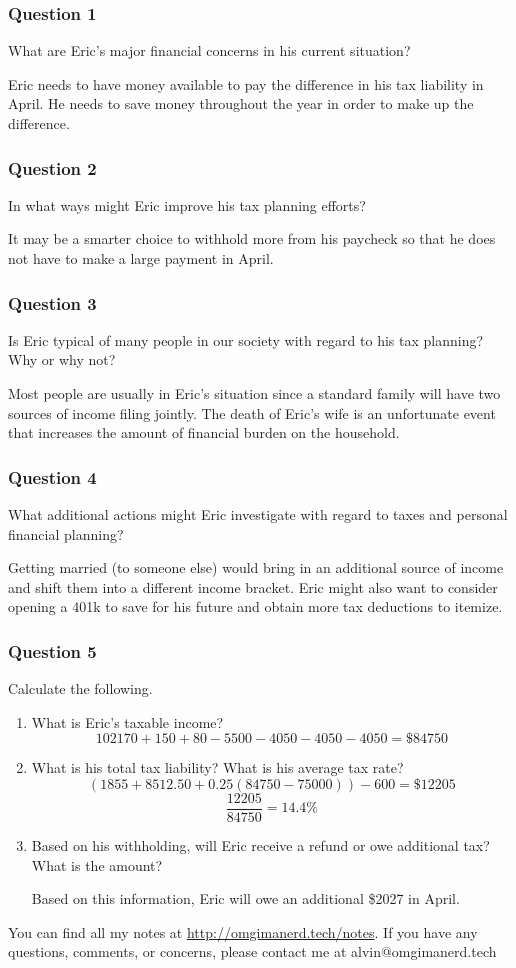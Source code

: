 \documentclass{math}
\begin{document}
\subsubsection*{Question 1}
What are Eric's major financial concerns in his current situation? \par
Eric needs to have money available to pay the difference in his tax liability
in April. He needs to save money throughout the year in order to make up the
difference.

\subsubsection*{Question 2}
In what ways might Eric improve his tax planning efforts? \par
It may be a smarter choice to withhold more from his paycheck so that he does
not have to make a large payment in April.

\subsubsection*{Question 3}
Is Eric typical of many people in our society with regard to his tax planning?
Why or why not? \par
Most people are usually in Eric's situation since a standard family will have
two sources of income filing jointly. The death of Eric's wife is an unfortunate
event that increases the amount of financial burden on the household.

\subsubsection*{Question 4}
What additional actions might Eric investigate with regard to taxes and
personal financial planning? \par
Getting married (to someone else) would bring in an additional source of income
and shift them into a different income bracket. Eric might also want to consider
opening a 401k to save for his future and obtain more tax deductions to itemize.

\subsubsection*{Question 5}
Calculate the following.
\begin{enumerate}
  \item What is Eric's taxable income?
  \[ 102170+150+80-5500-4050-4050-4050 = \$84750 \]
  \item What is his total tax liability? What is his average tax rate?
  \[ (1855+8512.50+0.25(84750-75000))-600 = \$12205 \]
  \[ \frac{12205}{84750} = 14.4\% \]
  \item Based on his withholding, will Eric receive a refund or owe additional
    tax? What is the amount? \par
    Based on this information, Eric will owe an additional \$2027 in April.
\end{enumerate}

\begin{center}
  You can find all my notes at \url{http://omgimanerd.tech/notes}. If you have
  any questions, comments, or concerns, please contact me at
  alvin@omgimanerd.tech
\end{center}
\end{document}
